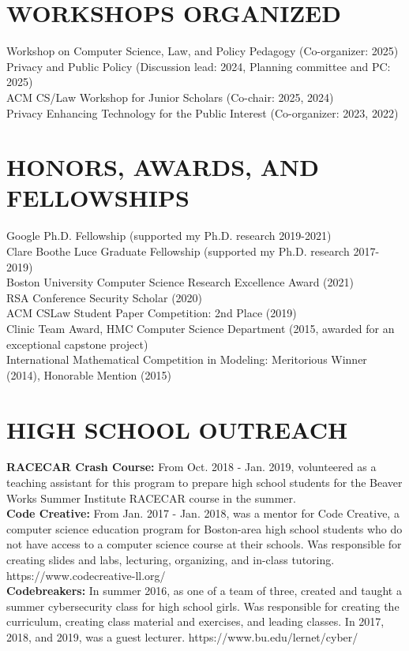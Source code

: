 \documentclass{res}
\begin{document}
\begin{resume}
\section{WORKSHOPS ORGANIZED}
\vspace{0.1in}
Workshop on Computer Science, Law, and Policy Pedagogy (Co-organizer: 2025) \\
Privacy and Public Policy (Discussion lead: 2024, Planning committee and PC: 2025) \\
ACM CS/Law Workshop for Junior Scholars (Co-chair: 2025, 2024) \\
Privacy Enhancing Technology for the Public Interest (Co-organizer: 2023, 2022)



\section{HONORS, AWARDS, AND FELLOWSHIPS}
\vspace{0.1in}
    Google Ph.D. Fellowship (supported my Ph.D. research 2019-2021) \\
    Clare Boothe Luce Graduate Fellowship (supported my Ph.D. research 2017-2019) \\
    Boston University Computer Science Research Excellence Award (2021) \\
    RSA Conference Security Scholar (2020) \\
    ACM CSLaw Student Paper Competition: 2nd Place (2019) \\
    Clinic Team Award, HMC Computer Science Department (2015, awarded for an exceptional capstone project) \\
    International Mathematical Competition in Modeling: Meritorious Winner (2014), Honorable Mention (2015) \\       



\section{HIGH SCHOOL OUTREACH}
\vspace{0.1in}

\textbf{RACECAR Crash Course:} From Oct. 2018 - Jan. 2019, volunteered as a teaching assistant for
this program to prepare high school students for the Beaver Works Summer Institute RACECAR course in the summer. \\
\textbf{Code Creative:} From Jan. 2017 - Jan. 2018, was a mentor for Code Creative, a computer science education
program for Boston-area high school students who do not have access to a computer science course at their schools.
Was responsible for creating slides and labs, lecturing, organizing, and in-class tutoring.
https://www.codecreative-ll.org/ \\
\textbf{Codebreakers:} In summer 2016, as one of a team of three, created and taught a summer cybersecurity class for
high school girls.  Was responsible for creating the curriculum, creating class material and exercises, and leading
classes.  In 2017, 2018, and 2019, was a guest lecturer.  https://www.bu.edu/lernet/cyber/ \\



\end{resume}
\end{document}
